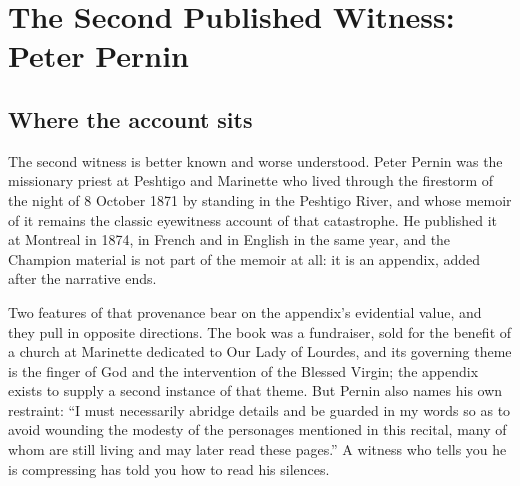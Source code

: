 \section{The Second Published Witness: Peter Pernin}

\subsection{Where the account sits}

The second witness is better known and worse understood. Peter Pernin
was the missionary priest at Peshtigo and Marinette who lived through
the firestorm of the night of 8 October 1871 by standing in the
Peshtigo River, and whose memoir of it remains the classic eyewitness
account of that catastrophe. He published it at Montreal in 1874, in
French and in English in the same year, and the Champion material is
not part of the memoir at all: it is an appendix, added after the
narrative ends.

Two features of that provenance bear on the appendix's evidential
value, and they pull in opposite directions. The book was a
fundraiser, sold for the benefit of a church at Marinette dedicated to
Our Lady of Lourdes, and its governing theme is the finger of God and
the intervention of the Blessed Virgin; the appendix exists to supply a
second instance of that theme. But Pernin also names his own restraint:
``I must necessarily abridge details and be guarded in my words so as
to avoid wounding the modesty of the personages mentioned in this
recital, many of whom are still living and may later read these
pages.'' A witness who tells you he is compressing has told you how to
read his silences.

